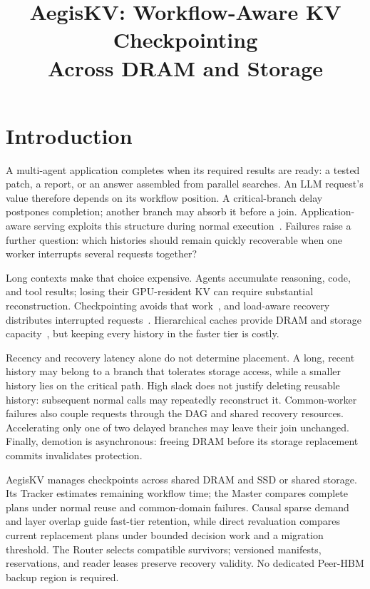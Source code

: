 \documentclass[sigplan,10pt,anonymous,nonacm]{acmart}
\title{AegisKV: Workflow-Aware KV Checkpointing\texorpdfstring{\\}{ }Across DRAM and Storage}
\begin{document}
\pagestyle{aegispreview}

\maketitle
\thispagestyle{aegispreview}
\raggedbottom

\section{Introduction}
\label{sec:introduction}

A multi-agent application completes when its required results are ready:
a tested patch, a report, or an answer assembled from parallel searches.
An LLM request's value therefore depends on its workflow position. A
critical-branch delay postpones completion; another branch may absorb it
before a join. Application-aware serving exploits this structure during
normal execution~\cite{lin2024parrot,pan2025kvflow,ni2026topas}. Failures
raise a further question: which histories should remain quickly
recoverable when one worker interrupts several requests together?

Long contexts make that choice expensive. Agents accumulate reasoning,
code, and tool results; losing their GPU-resident KV can require substantial
reconstruction. Checkpointing avoids that work~\cite{strati2024dejavu,jayakody2026ghostserve},
and load-aware recovery distributes interrupted requests~\cite{cao2026lumen}.
Hierarchical caches provide DRAM and storage capacity~\cite{qin2025mooncake,xie2026strata},
but keeping every history in the faster tier is costly.

Recency and recovery latency alone do not determine placement. A long,
recent history may belong to a branch that tolerates storage access,
while a smaller history lies on the critical path. High slack does not
justify deleting reusable history: subsequent normal calls may repeatedly
reconstruct it. Common-worker failures also couple requests through the
DAG and shared recovery resources. Accelerating only one of two delayed
branches may leave their join unchanged. Finally, demotion is asynchronous:
freeing DRAM before its storage replacement commits invalidates protection.

AegisKV manages checkpoints across shared DRAM and SSD or shared storage.
Its Tracker estimates remaining workflow time; the Master compares
complete plans under normal reuse and common-domain failures. Causal
sparse demand and layer overlap guide fast-tier retention, while direct
revaluation compares current replacement plans under bounded decision
work and a migration threshold. The Router selects compatible
survivors; versioned manifests, reservations, and reader leases preserve
recovery validity. No dedicated Peer-HBM backup region is required.
\end{document}
